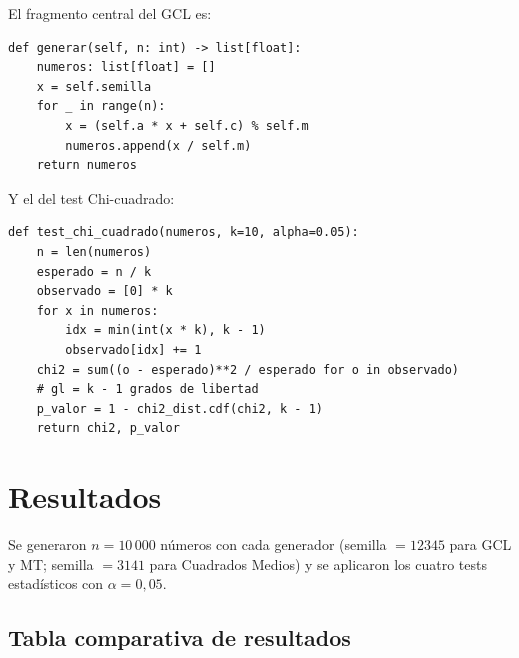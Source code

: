 \documentclass[a4paper, 11pt]{article}
\begin{document}
El fragmento central del GCL es:

\begin{lstlisting}[style=python, caption={Implementación del Generador Congruencial Lineal.}]
def generar(self, n: int) -> list[float]:
    numeros: list[float] = []
    x = self.semilla
    for _ in range(n):
        x = (self.a * x + self.c) % self.m
        numeros.append(x / self.m)
    return numeros
\end{lstlisting}

Y el del test Chi-cuadrado:

\begin{lstlisting}[style=python, caption={Test Chi-cuadrado de uniformidad.}]
def test_chi_cuadrado(numeros, k=10, alpha=0.05):
    n = len(numeros)
    esperado = n / k
    observado = [0] * k
    for x in numeros:
        idx = min(int(x * k), k - 1)
        observado[idx] += 1
    chi2 = sum((o - esperado)**2 / esperado for o in observado)
    # gl = k - 1 grados de libertad
    p_valor = 1 - chi2_dist.cdf(chi2, k - 1)
    return chi2, p_valor
\end{lstlisting}


\section{Resultados}

Se generaron $n = 10\,000$ números con cada generador (semilla $= 12345$ para
GCL y MT; semilla $= 3141$ para Cuadrados Medios) y se aplicaron los cuatro
tests estadísticos con $\alpha = 0{,}05$.

\subsection{Tabla comparativa de resultados}
\end{document}
